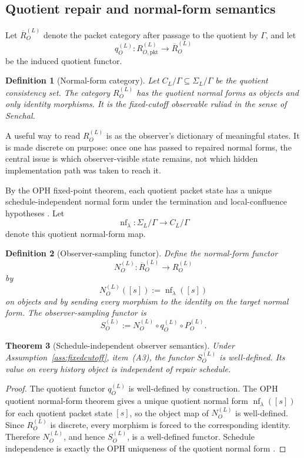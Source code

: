 \documentclass[11pt]{article}
\newtheorem{theorem}{Theorem}[section]
\newtheorem{definition}[theorem]{Definition}
\theoremstyle{remark}
\theoremstyle{plain}
\begin{document}
\subsection{Quotient repair and normal-form semantics}

Let \(\overline{R}^{(L)}_O\) denote the packet category after passage to the quotient by \(\Gamma\), and let
\[
q_O^{(L)}:R^{(L)}_{O,\mathrm{pkt}}\to \overline{R}^{(L)}_O
\]
be the induced quotient functor.

\begin{definition}[Normal-form category]
Let \(C_L/\Gamma\subseteq \Sigma_L/\Gamma\) be the quotient consistency set. The category \(R_O^{(L)}\) has the quotient normal forms as objects and only identity morphisms. It is the fixed-cutoff observable ruliad in the sense of Senchal.
\end{definition}

A useful way to read \(R_O^{(L)}\) is as the observer's dictionary of meaningful states. It is made discrete on purpose: once one has passed to repaired normal forms, the central issue is which observer-visible state remains, not which hidden implementation path was taken to reach it.

By the OPH fixed-point theorem, each quotient packet state has a unique schedule-independent normal form under the termination and local-confluence hypotheses \cite{ophconsensus}. Let
\[
\operatorname{nf}_\lambda:\Sigma_L/\Gamma\to C_L/\Gamma
\]
denote this quotient normal-form map.

\begin{definition}[Observer-sampling functor]
Define the normal-form functor
\[
N_O^{(L)}:\overline{R}^{(L)}_O\to R_O^{(L)}
\]
by
\[
N_O^{(L)}([s]):=\operatorname{nf}_\lambda([s])
\]
on objects and by sending every morphism to the identity on the target normal form. The observer-sampling functor is
\[
S_O^{(L)}
:=
N_O^{(L)}\circ q_O^{(L)}\circ P_O^{(L)}.
\]
\end{definition}

\begin{theorem}[Schedule-independent observer semantics]
\label{thm:schedule}
Under Assumption~\ref{ass:fixedcutoff}, item~(A3), the functor \(S_O^{(L)}\) is well-defined. Its value on every history object is independent of repair schedule.
\end{theorem}

\begin{proof}
The quotient functor \(q_O^{(L)}\) is well-defined by construction. The OPH quotient normal-form theorem gives a unique quotient normal form \(\operatorname{nf}_\lambda([s])\) for each quotient packet state \([s]\), so the object map of \(N_O^{(L)}\) is well-defined. Since \(R_O^{(L)}\) is discrete, every morphism is forced to the corresponding identity. Therefore \(N_O^{(L)}\), and hence \(S_O^{(L)}\), is a well-defined functor. Schedule independence is exactly the OPH uniqueness of the quotient normal form \cite{ophconsensus}.
\end{proof}
\end{document}
